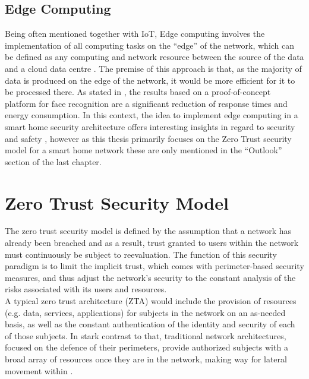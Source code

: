 \subsection{Edge Computing}
Being often mentioned together with IoT, Edge computing involves the implementation of all computing tasks on the “edge” of the network, which can be defined as any computing and network resource between the source of the data and a cloud data centre \cite{edge_comp}. The premise of this approach is that, as the majority of data is produced on the edge of the network, it would be more efficient for it to be processed there. As stated in \cite{edge_comp}, the results based on a proof-of-concept platform for face recognition are a significant reduction of response times and energy consumption. In this context, the idea to implement edge computing in a smart home security architecture offers interesting insights in regard to security and safety \cite{edge_comp_sec}, however as this thesis primarily focuses on the Zero Trust security model for a smart home network these are only mentioned in the “Outlook” section of the last chapter.

\section{Zero Trust Security Model}
The zero trust security model is defined by the assumption that a network has already been breached and as a result, trust granted to users within the network must continuously be subject to reevaluation. The function of this security paradigm is to limit the implicit trust, which comes with perimeter-based security measures, and thus adjust the network's security to the constant analysis of the risks associated with its users and resources.\\
A typical zero trust architecture (ZTA) would include the provision of resources (e.g. data, services, applications) for subjects in the network on an as-needed basis, as well as the constant authentication of the identity and security of each of those subjects. In stark contrast to that, traditional network architectures, focused on the defence of their perimeters, provide authorized subjects with a broad array of resources once they are in the network, making way for lateral movement within \cite{lateral_movement}.

